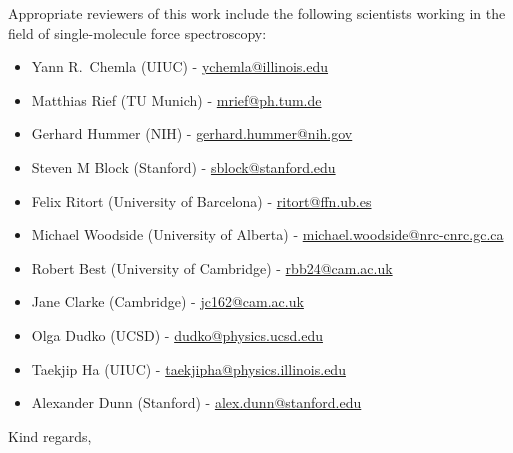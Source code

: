 \documentclass[ucb,qb3,10pt,fullfrom]{ucletter}
\begin{document}
\begin{letter}{}
Appropriate reviewers of this work include the following scientists working in the field of single-molecule force spectroscopy:
\begin{itemize}
  \item Yann R.~Chemla (UIUC) - \url{ychemla@illinois.edu}
  \item Matthias Rief (TU Munich) - \url{mrief@ph.tum.de}
  \item Gerhard Hummer (NIH) - \url{gerhard.hummer@nih.gov}
  \item Steven M Block (Stanford) - \url{sblock@stanford.edu}
  \item Felix Ritort (University of Barcelona) - \url{ritort@ffn.ub.es}  
  \item Michael Woodside (University of Alberta) - \url{michael.woodside@nrc-cnrc.gc.ca}
  \item Robert Best (University of Cambridge) - \url{rbb24@cam.ac.uk}
  \item Jane Clarke (Cambridge) - \url{jc162@cam.ac.uk}
  \item Olga Dudko (UCSD) - \url{dudko@physics.ucsd.edu}
  \item Taekjip Ha (UIUC) - \url{taekjipha@physics.illinois.edu}
  \item Alexander Dunn (Stanford) - \url{alex.dunn@stanford.edu}
\end{itemize}

\closing{Kind regards,}
\end{letter}
\end{document}
